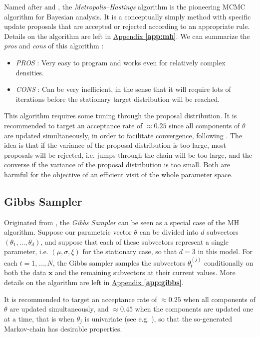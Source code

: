 Named after \citet{metropolis_1953} and  \cite{hastings_monte_1970} , the \emph{Metropolis–Hastings} algorithm is the pioneering MCMC algorithm for Bayesian analysis. It is a conceptually simply method with specific update proposals that are accepted or rejected according to an appropriate rule.
Details on the algorithm are left in \hyperref[app:mh]{Appendix \textbf{\ref{app:mh}}}.
We can summarize the \emph{pros} and \emph{cons} of this algorithm :

\begin{itemize}
	\item \emph{PROS} : Very easy to program and works even for relatively complex densities.
	\item \emph{CONS} : Can be very inefficient, in the sense that it will require lots of iterations before the stationary target distribution will be reached. 
\end{itemize}
This algorithm requires some tuning through the proposal distribution. 
It is recommended to target an acceptance rate of $\approx 0.25$ since all components of $\theta$ are updated simultaneously, in order to facilitate convergence, following \citet{BEDARD20082198}.
The idea is that if the variance of the proposal distribution is too large, most proposals will be rejected,	i.e. jumps through the chain will be too large, and the converse if the variance of the proposal distribution is too small.
Both are harmful for the objective of an efficient visit of the whole parameter space. 


\subsection{Gibbs Sampler}

Originated from \citet{Geman_1984}, the \emph{Gibbs Sampler} can be seen as a special case of the MH algorithm.
Suppose our parametric vector $\theta$ can be divided into $d$ subvectors $(\theta_1,\dots,\theta_d)$, and suppose that each of these subvectors represent a single parameter, i.e. $(\mu,\sigma,\xi)$ for the stationary case, so that $d=3$ in this model.
For each $t=1,\dots,N$, the Gibbs sampler samples the subvectors $\theta_t^{(j)}$ conditionally on both the data $\boldsymbol{x}$ and the remaining subvectors at their current values.
More details on the algorithm are left in \hyperref[app:gibbs]{Appendix \textbf{\ref{app:gibbs}}}.

It is recommended to target an acceptance rate of $\approx 0.25$ when all components of $\theta$ are updated simultaneously, and $\approx 0.45$ when the components are updated one at a time, that is when $\theta_j$ is univariate (see e.g. \citet[chap.11]{gelman_bayesian_2013}), so that the so-generated Markov-chain has desirable properties.


